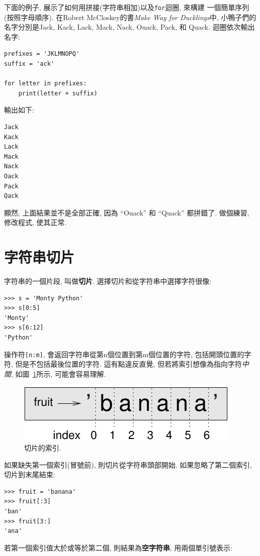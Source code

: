 \documentclass[10pt]{book}
\begin{document}
下面的例子, 展示了如何用拼接(字符串相加)以及{\tt for}迴圈, 來構建
一個簡單序列(按照字母順序). 
在Robert McCloskey的書{\em Make Way for Ducklings}中, 
小鴨子們的名字分別是Jack, Kack, Lack,
Mack, Nack, Ouack, Pack, 和 Quack.
迴圈依次輸出名字:

\begin{verbatim}
prefixes = 'JKLMNOPQ'
suffix = 'ack'

for letter in prefixes:
    print(letter + suffix)
\end{verbatim}
%
輸出如下:

\begin{verbatim}
Jack
Kack
Lack
Mack
Nack
Oack
Pack
Qack
\end{verbatim}
%
顯然, 上面結果並不是全部正確, 因為 ``Ouack'' 和 ``Quack'' 都拼錯了. 
做個練習, 修改程式, 使其正常. 



\section{字符串切片}
\label{slice}
  
 

字符串的一個片段, 叫做{\bf 切片}.
選擇切片和從字符串中選擇字符很像:

\begin{verbatim}
>>> s = 'Monty Python'
>>> s[0:5]
'Monty'
>>> s[6:12]
'Python'
\end{verbatim}
%
操作符{\tt [n:m]}, 會返回字符串從第n個位置到第m個位置的字符, 
包括開頭位置的字符, 但是不包括最後位置的字符. 
這有點違反直覺, 但若將索引想像為指向字符{\em 中間}, 如圖~\ref{fig.banana}所示,
可能會容易理解. 

\begin{figure}
\centerline
{\includegraphics[scale=0.8]{figs/banana.pdf}}
\caption{切片的索引.}
\label{fig.banana}
\end{figure}
如果缺失第一個索引(冒號前), 則切片從字符串頭部開始. 
如果忽略了第二個索引, 切片到末尾結束:

\begin{verbatim}
>>> fruit = 'banana'
>>> fruit[:3]
'ban'
>>> fruit[3:]
'ana'
\end{verbatim}
%
若第一個索引值大於或等於第二個, 則結果為{\bf 空字符串}, 用兩個單引號表示:
\end{document}

